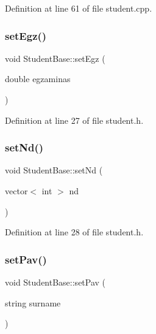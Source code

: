 Definition at line 61 of file student.\+cpp.

\mbox{\label{class_student_base_a62a8e545c6f0a53d1af6508856bbf670}} 
\subsubsection{\texorpdfstring{setEgz()}{setEgz()}}
{\footnotesize\ttfamily void Student\+Base\+::set\+Egz (\begin{DoxyParamCaption}\item[{double}]{egzaminas }\end{DoxyParamCaption})\hspace{0.3cm}{\ttfamily [inline]}}



Definition at line 27 of file student.\+h.

\mbox{\label{class_student_base_abca77bf7b90c9c6ad94975cbbb34979d}} 
\subsubsection{\texorpdfstring{setNd()}{setNd()}}
{\footnotesize\ttfamily void Student\+Base\+::set\+Nd (\begin{DoxyParamCaption}\item[{vector$<$ int $>$}]{nd }\end{DoxyParamCaption})\hspace{0.3cm}{\ttfamily [inline]}}



Definition at line 28 of file student.\+h.

\mbox{\label{class_student_base_a640675f1b05262dd1acaa798c2259675}} 
\subsubsection{\texorpdfstring{setPav()}{setPav()}}
{\footnotesize\ttfamily void Student\+Base\+::set\+Pav (\begin{DoxyParamCaption}\item[{string}]{surname }\end{DoxyParamCaption})\hspace{0.3cm}{\ttfamily [inline]}}



